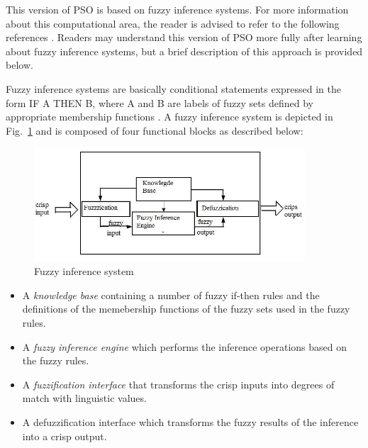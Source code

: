 This version of PSO is based on fuzzy inference systems. For more information about this computational area, the reader is advised to refer to the following references \cite{Sugeno1985,Jang1993}. Readers may understand this version of PSO more fully after learning about fuzzy inference systems, but a brief description of this approach is provided below.

Fuzzy inference systems are basically conditional statements expressed in the form IF A THEN B, where A and B are labels of fuzzy sets defined by appropriate membership functions \cite{Zadeh1973}. A fuzzy inference system is depicted in Fig.~\ref{fig:FUZZY} and is composed of four functional blocks as described below:

\begin{figure}[h!]
\centering
\includegraphics[width=0.90\textwidth]{"Part 2 - Search-Based Optimization/Particle Swarm Optimization/Images/Fig. 1.8.png"}
\caption{Fuzzy inference system}
\label{fig:FUZZY}
\end{figure}

\begin{itemize}
\item A \textit{knowledge base} containing a number of fuzzy if-then rules and the definitions of the memebership functions of the fuzzy sets used in the fuzzy rules.
\item A \textit{fuzzy inference engine} which performs the inference operations based on the fuzzy rules.
\item A \textit{fuzzification interface} that transforms the crisp inputs into degrees of match with linguistic values.
\item A defuzzification interface which transforms the fuzzy results of the inference into a crisp output.
\end{itemize}


